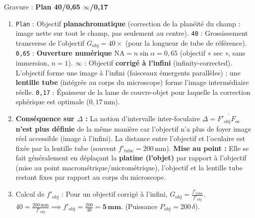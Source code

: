 \documentclass[11pt]{article}
\begin{document}
\begin{corrige}
Gravure : \textbf{Plan 40/0,65 $\infty$/0,17}

\begin{enumerate}
    \item \texttt{Plan} : Objectif \textbf{planachromatique} (correction de la planéité du champ : image nette sur tout le champ, pas seulement au centre).
    \texttt{40} : Grossissement transverse de l'objectif $G_{\text{obj}} = 40\times$ (pour la longueur de tube de référence).
    \texttt{0,65} : \textbf{Ouverture numérique} $\text{NA} = n \sin\alpha = 0,65$ (objectif « sec », sans immersion, $n=1$).
    \texttt{$\infty$} : Objectif \textbf{corrigé à l'infini} (infinity-corrected). L'objectif forme une image à l'infini (faisceaux émergents parallèles) ; une \textbf{lentille tube} (intégrée au corps du microscope) forme l'image intermédiaire réelle.
    \texttt{0,17} : Épaisseur de la lame de couvre-objet pour laquelle la correction sphérique est optimale ($0,17\,\text{mm}$).
    \item \textbf{Conséquence sur $\Delta$ :} La notion d'intervalle inter-foculaire $\Delta = \overline{F'_{\text{obj}}F_{\text{oc}}}$ \textbf{n'est plus définie} de la même manière car l'objectif n'a plus de foyer image réel accessible (image à l'infini). La distance entre l'objectif et l'oculaire est fixée par la lentille tube (souvent $f'_{\text{tube}} = 200\,\text{mm}$).
    \textbf{Mise au point :} Elle se fait généralement en déplaçant la \textbf{platine (l'objet)} par rapport à l'objectif (mise au point macrométrique/micrométrique), l'objectif et la lentille tube restant fixes par rapport au corps du microscope.
    \item Calcul de $f'_{\text{obj}}$ :
    Pour un objectif corrigé à l'infini, $G_{\text{obj}} = \frac{f'_{\text{tube}}}{f'_{\text{obj}}}$.
    $40 = \frac{200\,\text{mm}}{f'_{\text{obj}}} \implies f'_{\text{obj}} = \frac{200}{40} = \mathbf{5\,\text{mm}}$.
    (Puissance $P_{\text{obj}} = 200\,\delta$).
\end{enumerate}
\end{corrige}
\end{document}
